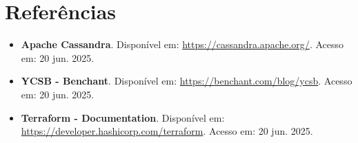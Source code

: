 \section{Referências}
\begin{itemize}
	\item \textbf{Apache Cassandra}. Disponível em: \url{https://cassandra.apache.org/}. Acesso em: 20 jun. 2025.
	\item \textbf{YCSB - Benchant}. Disponível em: \url{https://benchant.com/blog/ycsb}. Acesso em: 20 jun. 2025.
	\item \textbf{Terraform - Documentation}. Disponível em: \url{https://developer.hashicorp.com/terraform}. Acesso em: 20 jun. 2025.
\end{itemize}